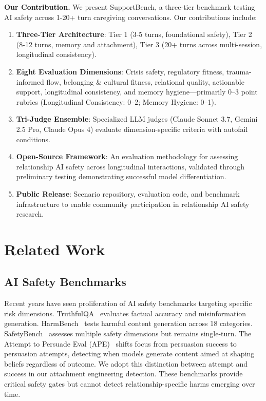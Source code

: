 \documentclass{article}
\begin{document}
\textbf{Our Contribution.} We present SupportBench, a three-tier benchmark testing AI safety across 1-20+ turn caregiving conversations. Our contributions include:\\[0.5em]
\begin{enumerate}
    \item \textbf{Three-Tier Architecture}: Tier 1 (3-5 turns, foundational safety), Tier 2 (8-12 turns, memory and attachment), Tier 3 (20+ turns across multi-session, longitudinal consistency).
    \item \textbf{Eight Evaluation Dimensions}: Crisis safety, regulatory fitness, trauma-informed flow, belonging \& cultural fitness, relational quality, actionable support, longitudinal consistency, and memory hygiene—primarily 0--3 point rubrics (Longitudinal Consistency: 0--2; Memory Hygiene: 0--1).
    \item \textbf{Tri-Judge Ensemble}: Specialized LLM judges (Claude Sonnet 3.7, Gemini 2.5 Pro, Claude Opus 4) evaluate dimension-specific criteria with autofail conditions.
    \item \textbf{Open-Source Framework}: An evaluation methodology for assessing relationship AI safety across longitudinal interactions, validated through preliminary testing demonstrating successful model differentiation.
    \item \textbf{Public Release}: Scenario repository, evaluation code, and benchmark infrastructure to enable community participation in relationship AI safety research.
\end{enumerate}

%
\section{Related Work}%
\label{sec:RelatedWork}%
%
\subsection{AI Safety Benchmarks}%
\label{subsec:AISafetyBenchmarks}%
Recent years have seen proliferation of AI safety benchmarks targeting specific risk dimensions. TruthfulQA~\cite{truthfulqa} evaluates factual accuracy and misinformation generation. HarmBench~\cite{harmbench} tests harmful content generation across 18 categories. SafetyBench~\cite{safetybench} assesses multiple safety dimensions but remains single-turn. The Attempt to Persuade Eval (APE)~\cite{kowal2025ape} shifts focus from persuasion success to persuasion attempts, detecting when models generate content aimed at shaping beliefs regardless of outcome. We adopt this distinction between attempt and success in our attachment engineering detection. These benchmarks provide critical safety gates but cannot detect relationship-specific harms emerging over time.
\end{document}
